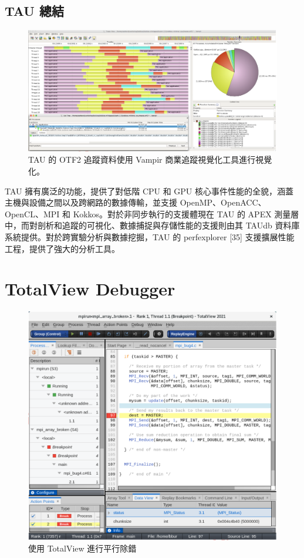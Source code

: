 \subsection{TAU 總結}

\begin{figure}
    \centering
    \includegraphics[width=0.9\linewidth]{FileAusiliari/Screenshots/Figure13-22.png}
    \caption{TAU 的 OTF2 追蹤資料使用 Vampir 商業追蹤視覺化工具進行視覺化。}
    \label{fig:PAPI22}
\end{figure}

TAU 擁有廣泛的功能，提供了對低階 CPU 和 GPU 核心事件性能的全貌，涵蓋主機與設備之間以及跨網路的數據傳輸，並支援 OpenMP、OpenACC、OpenCL、MPI 和 Kokkos。對於非同步執行的支援體現在 TAU 的 APEX 測量層中，而對剖析和追蹤的可視化、數據捕捉與存儲性能的支援則由其 TAUdb 資料庫系統提供。對於跨實驗分析與數據挖掘，TAU 的 perfexplorer [35] 支援擴展性能工程，提供了強大的分析工具。

\section{TotalView Debugger}


\begin{figure}
    \centering
    \includegraphics[width=0.9\linewidth]{FileAusiliari/Screenshots/Figure13-23.png}
    \caption{使用 TotalView 進行平行除錯}
    \label{fig:PAPI23}
\end{figure}

